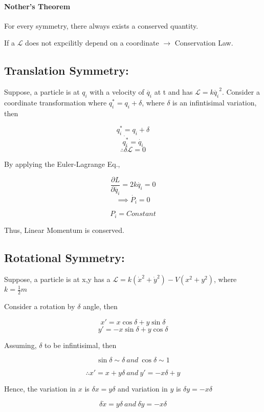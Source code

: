 \documentclass[a4paper]{article}
\newcommand{\Lagr}{\mathcal{L}}
\newcommand{\pdt}[2]{\frac{\partial #1}{\partial #2}}
\newcommand{\half}{\frac{1}{2}}
\begin{document}
		\paragraph*{Nother's Theorem}
			For every symmetry, there always exists a conserved quantity.
		
		If a $\Lagr$ does not expcilitly depend on a coordinate $\rightarrow$ Conservation Law.

		\subsection*{Translation Symmetry: }

			\noindent

			Suppose, a particle is at $q_i$ with a velocity of $\dot{q_i}$ at t and has $\Lagr = k\dot{q_i}^2$.
			Consider a coordinate transformation where $q_i^* = q_i + \delta$, where $\delta$ is an infintisimal variation, then
			
			$$ q_i^* = q_i + \delta $$
			$$ \dot{q_i^*} = \dot{q_i} $$
			$$\therefore \delta \Lagr = 0 $$

			By applying the Euler-Lagrange Eq., 

			$$ \pdt{L}{\dot{q_i}} = 2k\dot{q_i} = 0 $$
			$$\implies \dot{P_i} = 0 $$

			$$ P_i = Constant $$

			Thus, Linear Momentum is conserved.

		\subsection*{Rotational Symmetry: }

			\noindent

			Suppose, a particle is at x,y has a $\Lagr = k (\dot{x}^2 + \dot{y}^2) - V(x^2 + y^2)$, where $ k = \half m $	

			Consider a rotation by $\delta$ angle, then

			$$ x' = x\cos{\delta} + y\sin{\delta} $$
			$$ y' = -x\sin{\delta} + y\cos{\delta} $$

			Assuming, $\delta$ to be infintisimal, then

			$$ \sin{\delta} \sim \delta\ and\ \cos{\delta} \sim 1 $$

			$$\therefore x' = x + y\delta\ and\ y' = -x\delta + y $$

			Hence, the variation in $x$ is $\delta x = y \delta$ and variation in $y$ is $\delta y = -x \delta $

			$$ \delta \dot{x} = y \delta\ and\ \delta \dot{y} = - x \delta $$
\end{document}
